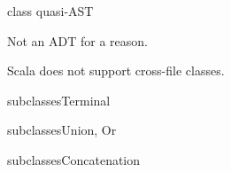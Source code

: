 

\begin{frame}{ class quasi-AST}
  \scalebox{0.6}{}

  \medskip

  Not an ADT for a  reason.

  Scala does not support cross-file  classes.
\end{frame}

\newsavebox\leafbox
\begin{lrbox}{\leafbox}
  \begin{minipage}{12cm}
    
  \end{minipage}
\end{lrbox}

\begin{frame}{ subclasses}{Terminal}
  \usebox\leafbox
\end{frame}

\newsavebox\orbox
\begin{lrbox}{\orbox}
  \begin{minipage}{12cm}
    
  \end{minipage}
\end{lrbox}

\newsavebox\andbox
\begin{lrbox}{\andbox}
  \begin{minipage}{12cm}
    
  \end{minipage}
\end{lrbox}


\begin{frame}{ subclasses}{Union, Or}
  \usebox\orbox
 \end{frame}




\newsavebox\catbox
\begin{lrbox}{\catbox}
  \begin{minipage}{12cm}
    
  \end{minipage}
\end{lrbox}


\begin{frame}{ subclasses}{Concatenation}
  \usebox\catbox
 \end{frame}



\newsavebox\starbox
\begin{lrbox}{\starbox}
  \begin{minipage}{12cm}
    
  \end{minipage}
\end{lrbox}

